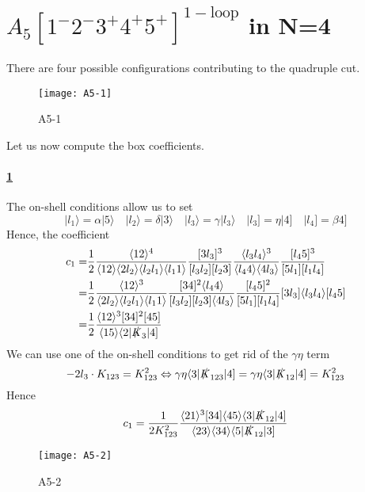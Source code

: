 \section{$A_5[1^-2^-3^+4^+5^+]^{\mathrm{1-loop}}$ in N=4}
There are four possible configurations contributing to the quadruple cut.
\begin{figure}[h!]
  \centering
    \texttt{[image: A5-1]}
    \caption{A5-1}
  \label{A5-1}
\end{figure}
Let us now compute the box coefficients.
%
\paragraph{\ref{A5-1}}
The on-shell conditions allow us to set
\begin{equation*}
|l_1\rangle = \alpha |5\rangle \quad
|l_2\rangle = \delta |3\rangle \quad
|l_3\rangle = \gamma |l_3\rangle\quad
|l_3] = \eta|4]\quad
|l_4] = \beta 4]
\end{equation*}
Hence, the coefficient
\begin{equation*}
\begin{split}
c_1 = &
\frac{1}{2}\frac{\langle 12 \rangle^4}{\langle 1 2 \rangle \langle 2 l_2\rangle \langle l_2 l_1 \rangle\langle l_1 1 \rangle}
\frac{[3l_3]^3}{[l_3 l_2][l_2 3]}
\frac{\langle l_3 l_4 \rangle^{3}}{\langle l_4 4 \rangle \langle 4 l_3\rangle}
\frac{[l_4 5 ]^3}{[5l_1][l_1 l_4]}
\\
= & 
\frac{1}{2}\frac{\langle 12 \rangle^3}{\langle 2 l_2 \rangle\langle l_2 l_1 \rangle\langle l_1 1\rangle}
\frac{[34]^2\langle l_4 4\rangle}{[l_3 l_2][l_2 3]\langle 4 l_3\rangle}
\frac{[l_4 5]^2}{[5l_1 ][l_1 l_4]}
[3 l_3]\langle l_3 l_4 \rangle [l_4 5]
\\
= &
\frac{1}{2}
\frac{\langle 12 \rangle^3[34]^2[45]}{\langle 15 \rangle\langle2|\slashed{K}_{3}|4]}
\end{split}
\end{equation*}
%
\color{gray}
We can use one of the on-shell conditions to get rid of the $\gamma\eta$ term
\begin{equation*}
-2l_3\cdot K_{123} = K_{123}^2 \Leftrightarrow \gamma\eta\langle 3 | \slashed{K}_{123}|4] = \gamma\eta\langle 3 | \slashed{K}_{12}|4] = K_{123}^2
\end{equation*}
Hence 
\begin{equation*}
c_1 = \frac{1}{2 K_{123}^2}\frac{\langle 2 1 \rangle^3 [34]\langle 45 \rangle\langle 3 | \slashed{K}_{12}|4]}{\langle 23 \rangle\langle 34 \rangle \langle 5 |\slashed{K}_{12}|3]}
\end{equation*}
\color{black}
%
\begin{figure}[h!]
  \centering
    \texttt{[image: A5-2]}
    \caption{A5-2}
  \label{A5-2}
\end{figure}
